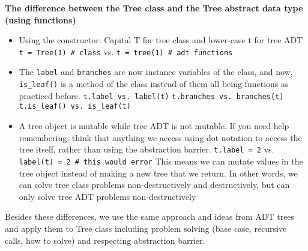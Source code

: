 \vspace{2mm}
\textbf{The difference between the Tree class and the Tree abstract data type (using functions)}
\begin{itemize}
\item Using the constructor: Capital T for tree class and lower-case t for tree ADT
    \subitem \lstinline{t = Tree(1) # class} vs. \lstinline{t = tree(1) # adt functions}
\item The \lstinline{label} and \lstinline{branches} are now instance variables of the class, and now, \lstinline{is_leaf()} is a method of the class instead of them all being functions as practiced before.
    \subitem \lstinline{t.label vs. label(t)}
    \subitem \lstinline{t.branches vs. branches(t)}
    \subitem \lstinline{t.is_leaf() vs. is_leaf(t)}
\item A tree object is mutable while tree ADT is not mutable. If you need help remembering, think that anything we access using dot notation to access the tree itself, rather than using the abstraction barrier.
    \subitem \lstinline{t.label = 2} vs. \lstinline{label(t) = 2 # this would error}
    \subitem This means we can mutate values in the tree object instead of making a new tree that we return. In other words, we can solve tree class problems non-destructively and destructively, but can only solve tree ADT problems non-destructively
\end{itemize}
Besides these differences, we use the same approach and ideas from ADT trees and apply them to Tree class including problem solving (base case, recursive calls, how to solve)  and respecting abstraction barrier. 
